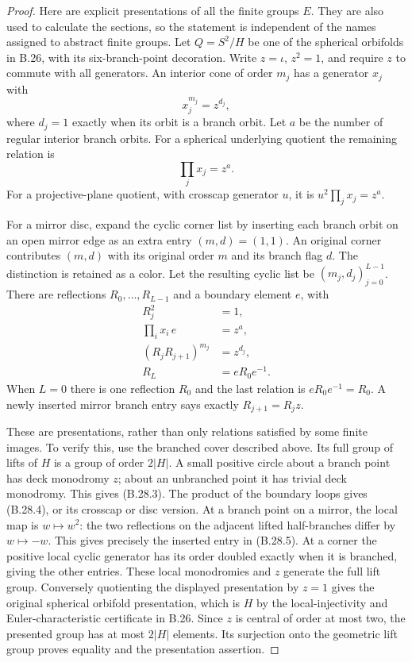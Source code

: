 \begin{proof}
Here are explicit presentations of all the finite groups $E$.
They are also used to calculate the sections, so the statement is
independent of the names assigned to abstract finite groups.  Let
$Q=S^2/H$ be one of the spherical orbifolds in B.26, with its
six-branch-point decoration.  Write $z=\iota$, $z^2=1$, and require
$z$ to commute with all generators.  An interior cone of order $m_j$
has a generator $x_j$ with
\[
                    x_j^{m_j}=z^{d_j},                 \tag{B.28.3}
\]
where $d_j=1$ exactly when its orbit is a branch orbit.  Let $a$ be
the number of regular interior branch orbits.  For a spherical
underlying quotient the remaining relation is
\[
                       \prod_jx_j=z^a.                 \tag{B.28.4}
\]
For a projective-plane quotient, with crosscap generator $u$, it is
$u^2\prod_jx_j=z^a$.

For a mirror disc, expand the cyclic corner list by inserting each
branch orbit on an open mirror edge as an extra entry $(m,d)=(1,1)$.
An original corner contributes $(m,d)$ with its original order $m$
and its branch flag $d$.  The distinction is retained as a color.
Let the resulting cyclic list be $(m_j,d_j)_{j=0}^{L-1}$.
There are reflections $R_0,\ldots,R_{L-1}$ and a boundary element
$e$, with
\[
 \begin{split}
 R_j^2&=1,\\
 \prod_i x_i\,e&=z^a,\\
 (R_jR_{j+1})^{m_j}&=z^{d_j},\\
 R_L&=eR_0e^{-1}.
 \end{split}
 \tag{B.28.5}
\]
When $L=0$ there is one reflection $R_0$ and the last relation is
$eR_0e^{-1}=R_0$.  A newly inserted mirror branch entry says exactly
$R_{j+1}=R_jz$.

These are presentations, rather than only relations satisfied by
some finite images.  To verify this, use the branched cover described
above.  Its full group of lifts of $H$ is a group of order $2|H|$.
A small positive circle about a branch point has deck monodromy $z$;
about an unbranched point it has trivial deck monodromy.  This gives
(B.28.3).  The product of the boundary loops gives (B.28.4), or its
crosscap or disc version.  At a branch point on a mirror, the local
map is $w\mapsto w^2$: the two reflections on the adjacent lifted
half-branches differ by $w\mapsto-w$.  This gives precisely the
inserted entry in (B.28.5).  At a corner the positive local cyclic
generator has its order doubled exactly when it is branched, giving
the other entries.  These local monodromies and $z$ generate the full
lift group.  Conversely quotienting the displayed presentation by
$z=1$ gives the original spherical orbifold presentation, which is
$H$ by the local-injectivity and Euler-characteristic certificate in
B.26.  Since $z$ is central of order at most two, the presented group
has at most $2|H|$ elements.  Its surjection onto the geometric lift
group proves equality and the presentation assertion.


\end{proof}
